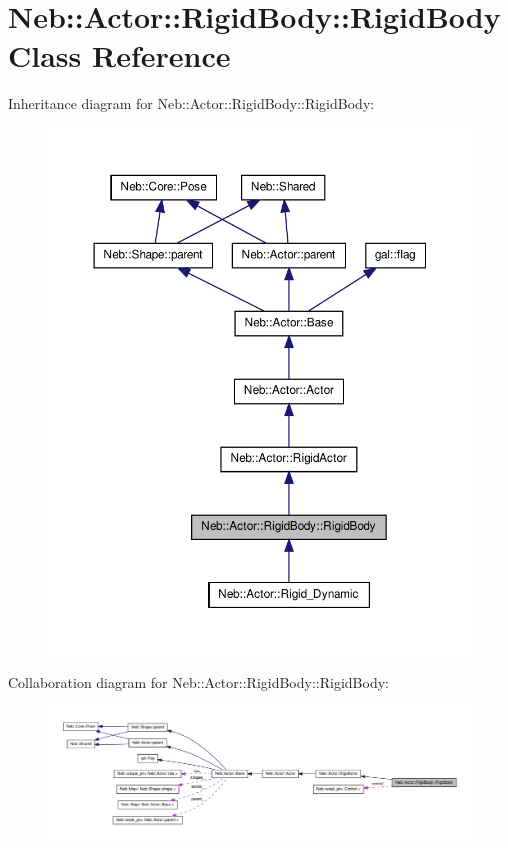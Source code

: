 \hypertarget{classNeb_1_1Actor_1_1RigidBody_1_1RigidBody}{\section{\-Neb\-:\-:\-Actor\-:\-:\-Rigid\-Body\-:\-:\-Rigid\-Body \-Class \-Reference}
\label{classNeb_1_1Actor_1_1RigidBody_1_1RigidBody}
}


\-Inheritance diagram for \-Neb\-:\-:\-Actor\-:\-:\-Rigid\-Body\-:\-:\-Rigid\-Body\-:
\nopagebreak
\begin{figure}[H]
\begin{center}
\leavevmode
\includegraphics[width=350pt]{classNeb_1_1Actor_1_1RigidBody_1_1RigidBody__inherit__graph}
\end{center}
\end{figure}


\-Collaboration diagram for \-Neb\-:\-:\-Actor\-:\-:\-Rigid\-Body\-:\-:\-Rigid\-Body\-:
\nopagebreak
\begin{figure}[H]
\begin{center}
\leavevmode
\includegraphics[width=350pt]{classNeb_1_1Actor_1_1RigidBody_1_1RigidBody__coll__graph}
\end{center}
\end{figure}
